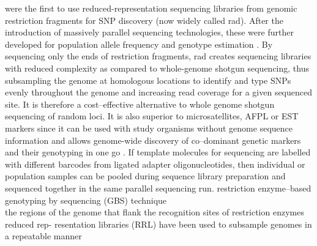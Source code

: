 \documentclass[a4paper,12pt,times,authoryear,twoside,print,index]{Classes/PhDThesisPSnPDF}\usepackage[]{graphicx}\usepackage[]{color}
\begin{document}
\cite{Altshuler2000} were the first to use reduced-representation sequencing libraries from genomic restriction fragments for SNP discovery (now widely called \gls{rad}). After the introduction of massively parallel sequencing technologies, these were further developed for population allele frequency and genotype estimation \citep{Baird2008,VanTassell2008,Andolfatto2011,Elshire2011,Davey2011}.  By sequencing only the ends of restriction fragments, \gls{rad} creates sequencing libraries with reduced complexity as compared to whole-genome shotgun sequencing, thus subsampling the genome at homologous locations to identify and type SNPs evenly throughout the genome and increasing \gls{read} coverage for a given sequenced site. It is therefore a cost--effective alternative to whole genome shotgun sequencing of random loci. It is also superior to microsatellites, AFPL or EST markers since it can be used with study organisms without genome sequence information and allows genome-wide discovery of co--dominant genetic markers and their genotyping in one go \citep{Davey2011}. If template molecules for sequencing are labelled with different \glspl{barcode} from ligated adapter oligonucleotides, then individual or population samples can be pooled during sequence library preparation and sequenced together in the same parallel sequencing run. restriction enzyme--based genotyping by sequencing (GBS) technique \\
the regions of the genome that flank the recognition sites of restriction enzymes \\
reduced rep- resentation libraries (RRL) have been used to subsample genomes in a repeatable manner
\end{document}
